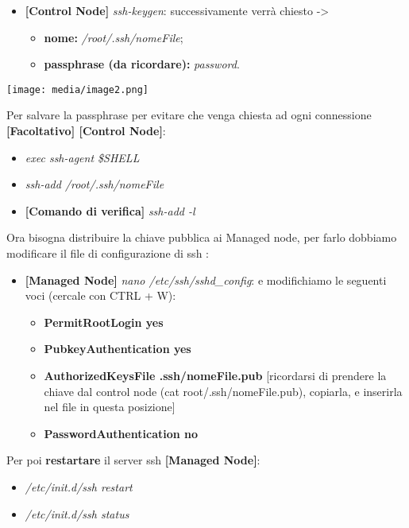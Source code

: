 \begin{itemize}
\item
  \textbf{{[}Control Node{]}} \emph{ssh-keygen}: successivamente verrà
  chiesto -\textgreater{}

  \begin{itemize}
  \item
    \textbf{nome:} \emph{/root/.ssh/nomeFile};
  \item
    \textbf{passphrase (da ricordare):} \emph{password}.
  \end{itemize}
\end{itemize}

\texttt{[image: media/image2.png]}

Per salvare la passphrase per evitare che venga chiesta ad ogni
connessione \textbf{{[}Facoltativo{]} {[}Control Node{]}}:

\begin{itemize}
\item
  \emph{exec ssh-agent \$SHELL}
\item
  \emph{ssh-add /root/.ssh/nomeFile}
\item
  \textbf{{[}Comando di verifica{]}} \emph{ssh-add -l}
\end{itemize}

Ora bisogna distribuire la chiave pubblica ai Managed node, per farlo
dobbiamo modificare il file di configurazione di ssh :

\begin{itemize}
\item
  \textbf{{[}Managed Node{]}} \emph{nano /etc/ssh/sshd\_config}: e
  modifichiamo le seguenti voci (cercale con CTRL + W):

  \begin{itemize}
  \item
    \textbf{PermitRootLogin yes}
  \item
    \textbf{PubkeyAuthentication yes}
  \item
    \textbf{AuthorizedKeysFile .ssh/nomeFile.pub} {[}ricordarsi di
    prendere la chiave dal control node (cat root/.ssh/nomeFile.pub),
    copiarla, e inserirla nel file in questa posizione{]}
  \item
    \textbf{PasswordAuthentication no}
  \end{itemize}
\end{itemize}

Per poi \textbf{restartare} il server ssh \textbf{{[}Managed Node{]}}:

\begin{itemize}
\item
  \emph{/etc/init.d/ssh restart}
\item
  \emph{/etc/init.d/ssh status}
\end{itemize}

